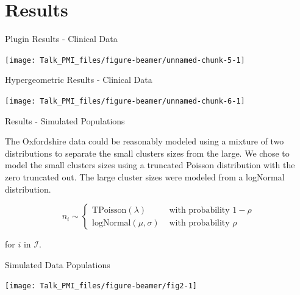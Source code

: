 \documentclass[ignorenonframetext,]{beamer}
\begin{document}
\hypertarget{results}{%
\section{Results}\label{results}}

\begin{frame}{Plugin Results - Clinical Data}
\protect\hypertarget{plugin-results---clinical-data}{}

\begin{center}\texttt{[image: Talk\_PMI\_files/figure-beamer/unnamed-chunk-5-1]} \end{center}

\end{frame}

\begin{frame}{Hypergeometric Results - Clinical Data}
\protect\hypertarget{hypergeometric-results---clinical-data}{}

\begin{center}\texttt{[image: Talk\_PMI\_files/figure-beamer/unnamed-chunk-6-1]} \end{center}

\end{frame}

\begin{frame}{Results - Simulated Populations}
\protect\hypertarget{results---simulated-populations}{}

The Oxfordshire data could be reasonably modeled using a mixture of two
distributions to separate the small clusters sizes from the large. We
chose to model the small clusters sizes using a truncated Poisson
distribution with the zero truncated out. The large cluster sizes were
modeled from a logNormal distribution.

\[n_i \sim \begin{cases}
 \textrm{TPoisson}(\lambda)       & \textrm{ with probability } 1 - \rho \\
 \textrm{logNormal}(\mu, \sigma)  &\textrm{ with probability } \rho 
\end{cases}\]

for \(i\) in \(\mathcal{I}\).

\end{frame}

\begin{frame}{Simulated Data Populations}
\protect\hypertarget{simulated-data-populations}{}

\begin{center}\texttt{[image: Talk\_PMI\_files/figure-beamer/fig2-1]} \end{center}

\end{frame}
\end{document}

